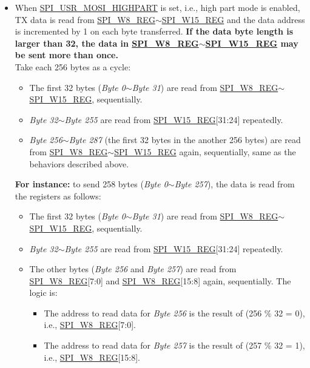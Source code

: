 \documentclass[main\_\_EN.tex]{subfiles}
\begin{document}
\begin{itemize}
\begin{itemize}
\begin{itemize}
\begin{itemize}
                \item The address to read data for \emph{Byte 257} is the result of (257 \% 64 = 1), i.e., \hyperref[regdesc:SPIW0REG]{SPI\_W0\_REG}[15:8].
            \end{itemize}
        \end{itemize}
        \item When \hyperref[fielddesc:SPIUSRMOSIHIGHPART]{SPI\_USR\_MOSI\_HIGHPART} is set, i.e., high part mode is enabled, TX data is read from \hyperref[regdesc:SPIW0REG]{SPI\_W8\_REG}$\sim$\hyperref[regdesc:SPIW0REG]{SPI\_W15\_REG} and the data address is incremented by 1 on each byte transferred. \textbf{If the data byte length is larger than 32, the data in \hyperref[regdesc:SPIW0REG]{SPI\_W8\_REG}$\sim$\hyperref[regdesc:SPIW0REG]{SPI\_W15\_REG} may be sent more than once.} \\
        Take each 256 bytes as a cycle:
        \begin{itemize}
            \item The first 32 bytes (\emph{Byte 0}$\sim$\emph{Byte 31}) are read from \hyperref[regdesc:SPIW0REG]{SPI\_W8\_REG}$\sim$\hyperref[regdesc:SPIW0REG]{SPI\_W15\_REG}, sequentially.
            \item \emph{Byte 32}$\sim$\emph{Byte 255} are read from \hyperref[regdesc:SPIW0REG]{SPI\_W15\_REG}[31:24] repeatedly.
            \item \emph{Byte 256}$\sim$\emph{Byte 287} (the first 32 bytes in the another 256 bytes) are read from \hyperref[regdesc:SPIW0REG]{SPI\_W8\_REG}$\sim$\hyperref[regdesc:SPIW0REG]{SPI\_W15\_REG} again, sequentially, same as the behaviors described above.
        \end{itemize}
        \textbf{For instance:} to send 258 bytes (\emph{Byte 0}$\sim$\emph{Byte 257}), the data is read from the registers as follows:
        \begin{itemize}
            \item The first 32 bytes (\emph{Byte 0}$\sim$\emph{Byte 31}) are read from \hyperref[regdesc:SPIW0REG]{SPI\_W8\_REG}$\sim$\hyperref[regdesc:SPIW0REG]{SPI\_W15\_REG}, sequentially.
            \item \emph{Byte 32}$\sim$\emph{Byte 255} are read from \hyperref[regdesc:SPIW0REG]{SPI\_W15\_REG}[31:24] repeatedly.
            \item The other bytes (\emph{Byte 256} and \emph{Byte 257}) are read from \hyperref[regdesc:SPIW0REG]{SPI\_W8\_REG}[7:0] and \hyperref[regdesc:SPIW0REG]{SPI\_W8\_REG}[15:8] again, sequentially. The logic is:
            \begin{itemize}
                \item The address to read data for \emph{Byte 256} is the result of (256 \% 32 = 0), i.e., \hyperref[regdesc:SPIW0REG]{SPI\_W8\_REG}[7:0].
                \item The address to read data for \emph{Byte 257} is the result of (257 \% 32 = 1), i.e., \hyperref[regdesc:SPIW0REG]{SPI\_W8\_REG}[15:8].
            \end{itemize}
        \end{itemize}
    \end{itemize}


\end{itemize}
\end{document}
